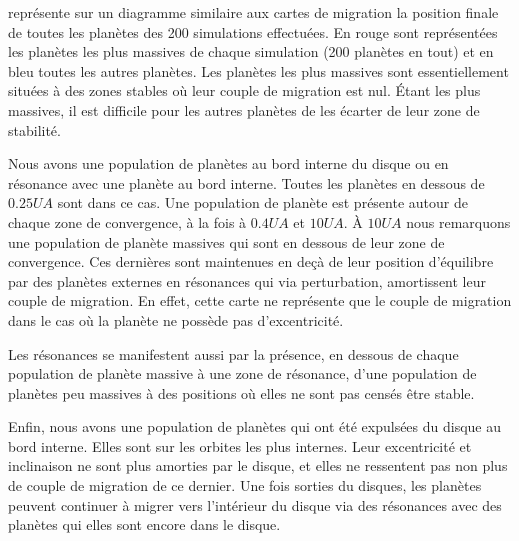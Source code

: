  représente sur un diagramme similaire aux cartes de migration la position finale de toutes les planètes des 200 simulations effectuées. En rouge sont représentées les planètes les plus massives de chaque simulation (200 planètes en tout) et en bleu toutes les autres planètes. Les planètes les plus massives sont essentiellement situées à des zones stables où leur couple de migration est nul. Étant les plus massives, il est difficile pour les autres planètes de les écarter de leur zone de stabilité. 

Nous avons une population de planètes au bord interne du disque ou en résonance avec une planète au bord interne. Toutes les planètes en dessous de $0.25\unit{UA}$ sont dans ce cas. Une population de planète est présente autour de chaque zone de convergence, à la fois à $0.4\unit{UA}$ et $10\unit{UA}$. À $10\unit{UA}$ nous remarquons une population de planète massives qui sont en dessous de leur zone de convergence. Ces dernières sont maintenues en deçà de leur position d'équilibre par des planètes externes en résonances qui via perturbation, amortissent leur couple de migration. En effet, cette carte ne représente que le couple de migration dans le cas où la planète ne possède pas d'excentricité. 

Les résonances se manifestent aussi par la présence, en dessous de chaque population de planète massive à une zone de résonance, d'une population de planètes peu massives à des positions où elles ne sont pas censés être stable. 

Enfin, nous avons une population de planètes qui ont été expulsées du disque au bord interne. Elles sont sur les orbites les plus internes. Leur excentricité et inclinaison ne sont plus amorties par le disque, et elles ne ressentent pas non plus de couple de migration de ce dernier. Une fois sorties du disques, les planètes peuvent continuer à migrer vers l'intérieur du disque via des résonances avec des planètes qui elles sont encore dans le disque. 

